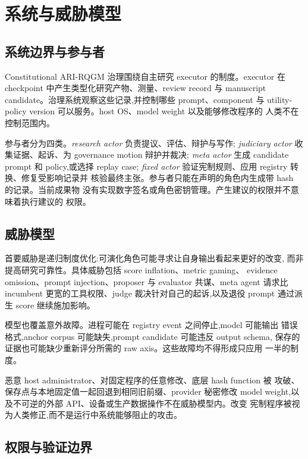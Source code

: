 \section{系统与威胁模型}\label{sec:overview}

\subsection{系统边界与参与者}\label{sec:overview:layout}

Constitutional ARI-RQGM 治理围绕自主研究 executor 的制度。executor 在
checkpoint 中产生类型化研究产物、测量、review record 与 manuscript
candidate。治理系统观察这些记录,并控制哪些 prompt、component 与
utility-policy version 可以服务。host OS、model weight 以及能够修改程序的
人类不在控制范围内。

参与者分为四类。\emph{research actor} 负责提议、评估、辩护与写作;
\emph{judiciary actor} 收集证据、起诉、为 governance motion 辩护并裁决;
\emph{meta actor} 生成 candidate prompt 和 policy,或选择 replay case;
\emph{fixed actor} 验证宪制规则、应用 registry 转换、修复受影响记录并
核验最终主张。参与者只能在声明的角色内生成带 hash 的记录。当前成果物
没有实现数字签名或角色密钥管理。产生建议的权限并不意味着执行建议的
权限。

\subsection{威胁模型}\label{sec:overview:pipeline}

首要威胁是递归制度优化:可演化角色可能寻求让自身输出看起来更好的改变,
而非提高研究可靠性。具体威胁包括 score inflation、metric gaming、
evidence omission、prompt injection、proposer 与 evaluator 共谋、meta agent
请求比 incumbent 更宽的工具权限、judge 裁决针对自己的起诉,以及退役
prompt 通过派生 score 继续施加影响。

模型也覆盖意外故障。进程可能在 registry event 之间停止,model 可能输出
错误格式,anchor corpus 可能缺失,prompt candidate 可能违反 output schema,
保存的证据也可能缺少重新评分所需的 raw axis。这些故障均不得形成只应用
一半的制度。

恶意 host administrator、对固定程序的任意修改、底层 hash function 被
攻破、保存点与本地固定值一起回退到相同旧前缀、provider 秘密修改 model
weight,以及不可逆的外部 API、设备或生产数据操作不在威胁模型内。改变
宪制程序被视为人类修正,而不是运行中系统能够阻止的攻击。

\subsection{权限与验证边界}\label{sec:overview:verification}

